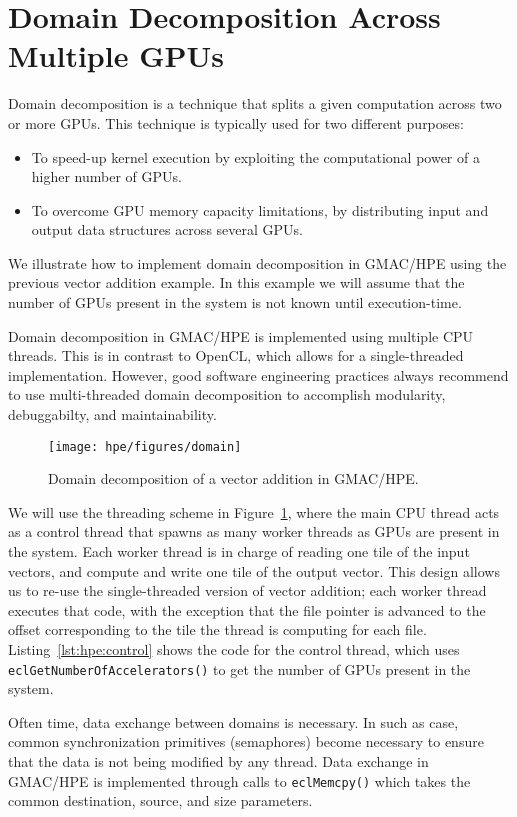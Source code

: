 \section{Domain Decomposition Across Multiple GPUs}
Domain decomposition is a technique that splits a given computation across two or more GPUs. This 
technique is typically used for two different purposes:
\begin{itemize}
\item To speed\hyp{}up kernel execution by exploiting the computational power of a higher number of 
GPUs.
\item To overcome GPU memory capacity limitations, by distributing input and output data structures 
across several GPUs.
\end{itemize}

We illustrate how to implement domain decomposition in GMAC\slash HPE using the previous vector 
addition example. In this example we will assume that the number of GPUs present in the system is 
not known until execution\hyp{}time.

Domain decomposition in GMAC\slash HPE is implemented using multiple CPU threads. This is in 
contrast to OpenCL, which allows for a single\hyp{}threaded implementation. However, good software 
engineering practices always recommend to use multi\hyp{}threaded domain decomposition to accomplish 
modularity, debuggabilty, and maintainability. 

\begin{figure}
\centering
\texttt{[image: hpe/figures/domain]}
\caption{Domain decomposition of a vector addition in GMAC\slash HPE\@.}
\label{fig:hpe:domain}
\end{figure}



We will use the threading scheme in Figure~\ref{fig:hpe:domain}, where the main CPU thread acts as a 
control thread that spawns as many worker threads as GPUs are present in the system. Each worker 
thread is in charge of reading one tile of the input vectors, and compute and write one tile of the 
output vector. This design allows us to re\hyp{}use the single\hyp{}threaded version of vector 
addition; each worker thread executes that code, with the exception that the file pointer is 
advanced to the offset corresponding to the tile the thread is computing for each file.  
Listing~\ref{lst:hpe:control} shows the code for the control thread, which uses 
\texttt{ecl\-Get\-Number\-Of\-Accelerators()} to get the number of GPUs present in the system.

Often time, data exchange between domains is necessary. In such as case, common synchronization 
primitives (\eg semaphores) become necessary to ensure that the data is not being modified by any 
thread. Data exchange in GMAC\slash HPE is implemented through calls to \texttt{eclMemcpy()} which 
takes the common destination, source, and size parameters.

